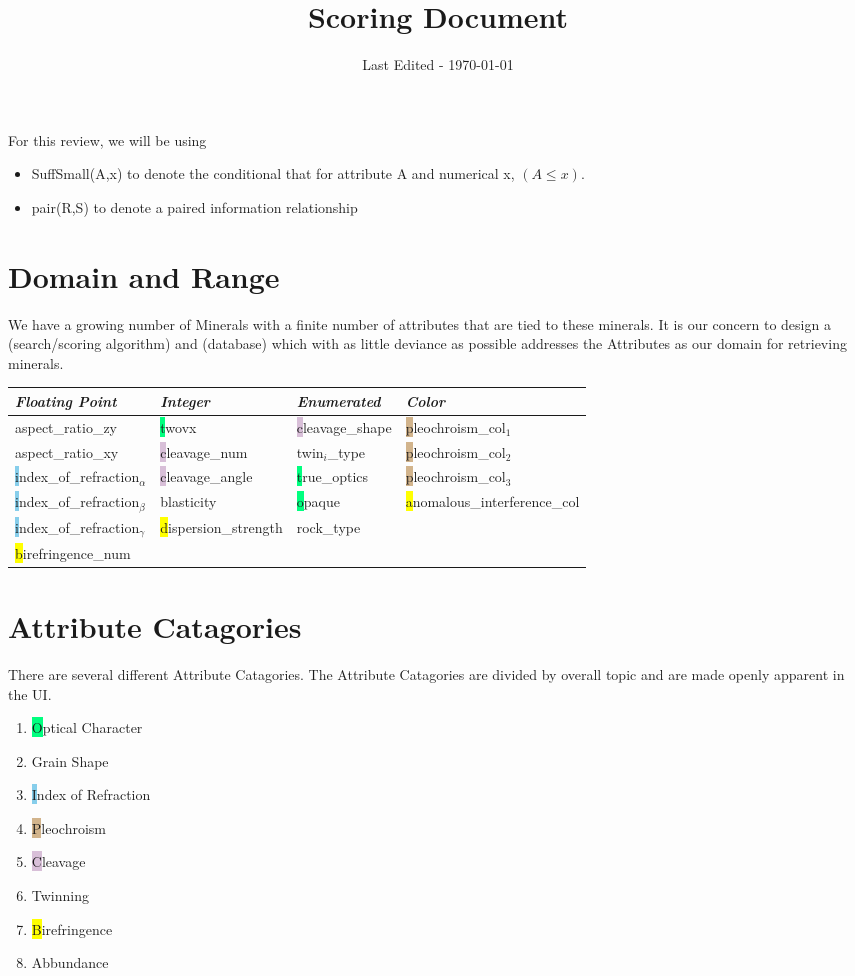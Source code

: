 \documentclass{article}
\title{Scoring Document}
\date{Last Edited - \today}
\newcommand{\SSm}[2]{SuffSmall(#1,#2)}
\newcommand{\p}[2]{pair(#1,#2)}
\def \A{Attribute\xspace}
\def \AS{\A Catagories\xspace}
\def \OC{Optical Character\xspace}
\def \GS{Grain Shape\xspace}
\def \IRF{Index of Refraction\xspace}
\def \Col{Pleochroism\xspace}
\def \C{Cleavage\xspace}
\def \T{Twinning\xspace}
\def \B{Birefringence\xspace}
\def \Ab{Abbundance\xspace}
\def \OCc{SpringGreen}
\def \GSc{OliveGreen}
\def \IRFc{SkyBlue}
\def \Colc{Tan}
\def \Cc{Thistle}
\def \Tc{Melon}
\def \Bc{Yellow}
\def \Abc{RedViolet}
\def \cs{cleavage\_shape\xspace}
\def \twt{twin$_i$\_type\xspace}
\def \to{true\_optics\xspace}
\def \op{opaque\xspace}
\def \rt{rock\_type\xspace}
\def \tvx{twovx\xspace}
\def \cn{cleavage\_num\xspace}
\def \bl{blasticity\xspace}
\def \ca{cleavage\_angle\xspace}
\def \ds{dispersion\_strength\xspace}
\def \arzy{aspect\_ratio\_zy\xspace}
\def \arxy{aspect\_ratio\_xy\xspace}
\def \ira{index\_of\_refraction$_\alpha$\xspace}
\def \irb{index\_of\_refraction$_\beta$\xspace}
\def \irc{index\_of\_refraction$_\gamma$\xspace}
\def \b{birefringence\_num\xspace}
\def \plcola{pleochroism\_col$_1$\xspace}
\def \plcolb{pleochroism\_col$_2$\xspace}
\def \plcolc{pleochroism\_col$_3$\xspace}
\def \aic{anomalous\_interference\_col\xspace}
\begin{document}
\maketitle
For this review, we will be using 
\begin{itemize}
\item \SSm{A}{x} to denote the conditional that for attribute A and numerical x, $(A\leq x)$.
\item \p{R}{S} to denote a paired information relationship
\end{itemize}


\section*{Domain and Range}
We have a growing number of Minerals with a finite number of attributes that are tied to these minerals. It is our concern to design a (search/scoring algorithm) and (database) which with as little deviance as possible addresses the Attributes as our domain for retrieving minerals. 


\begin{tabular}{|l|l|l|l|}
  
  {\bf\em Floating Point}&{\bf\em Integer}&{\bf\em Enumerated}&{\bf\em Color}\\
   \hline
   { \colorbox{\GSc} \arzy }&{ \colorbox{\OCc} \tvx }&{ \colorbox{\Cc} \cs }&{ \colorbox{\Colc} \plcola }\\
   { \colorbox{\GSc} \arxy }&{ \colorbox{\Cc} \cn  }&{ \colorbox{\Tc} \twt }&{ \colorbox{\Colc} \plcolb }\\
   { \colorbox{\IRFc} \ira }&{ \colorbox{\Cc} \ca  }&{ \colorbox{\OCc} \to  }&{ \colorbox{\Colc} \plcolc }\\
   { \colorbox{\IRFc} \irb }&{ \colorbox{\GSc} \bl  }&{ \colorbox{\OCc} \op  }&{ \colorbox{\Bc} \aic    }\\
   { \colorbox{\IRFc} \irc }&{ \colorbox{\Bc} \ds  }&{ \colorbox{\Abc} \rt  }&         \\
   { \colorbox{\Bc} \b     }& &  & \\
\end{tabular}
   
\section*{\AS}
There are several different \AS. The \AS are divided by overall topic and are made openly apparent in the UI. 

\begin{multicols}{2}
\begin{enumerate}
\item {\colorbox{\OCc} \OC}
\item {\colorbox{\GSc} \GS}
\item {\colorbox{\IRFc} \IRF}
\item {\colorbox{\Colc} \Col}
\item {\colorbox{\Cc} \C}
\item {\colorbox{\Tc} \T}
\item {\colorbox{\Bc} \B}
\item {\colorbox{\Abc} \Ab}
\end{enumerate}
\end{multicols}
\end{document}
